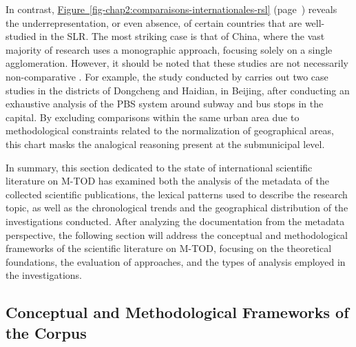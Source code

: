 \begin{refsegment}
In contrast, \hyperref[fig-chap2:comparaisons-internationales-rsl]{Figure~\ref{fig-chap2:comparaisons-internationales-rsl}} (page~\pageref{fig-chap2:comparaisons-internationales-rsl}) reveals the underrepresentation, or even absence, of certain countries that are well-studied in the \acrshort{SLR}. The most striking case is that of China, where the vast majority of research uses a monographic approach, focusing solely on a single agglomeration. However, it should be noted that these studies are not necessarily non-comparative \textcolor{blue}{\autocite[30-31]{gueranger_monographie_2012}}. For example, the study conducted by \textcolor{blue}{\textcite[77]{liu_solving_2012}} carries out two case studies in the districts of Dongcheng and Haidian, in Beijing, after conducting an exhaustive analysis of the \acrshort{PBS} system around subway and bus stops in the capital. By excluding comparisons within the same urban area due to methodological constraints related to the normalization of geographical areas, this chart masks the analogical reasoning present at the submunicipal level.%

In summary, this section dedicated to the state of international scientific literature on \acrshort{M-TOD} has examined both the analysis of the metadata of the collected scientific publications, the lexical patterns used to describe the research topic, as well as the chronological trends and the geographical distribution of the investigations conducted. After analyzing the documentation from the metadata perspective, the following section will address the conceptual and methodological frameworks of the scientific literature on \acrshort{M-TOD}, focusing on the theoretical foundations, the evaluation of approaches, and the types of analysis employed in the investigations.%

\subsection{Conceptual and Methodological Frameworks of the Corpus
    \label{chap2:cadres-conceptuels-methodologiques}
    }


\end{refsegment}
